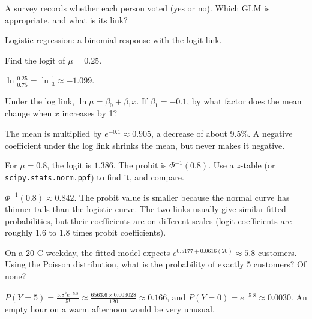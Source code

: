 \begin{Exercise}[label=glm2, title=Name the model]
A survey records whether each person voted (yes or no). Which GLM is appropriate, and what is its link?
\end{Exercise}
\begin{Answer}[ref=glm2]
Logistic regression: a binomial response with the logit link.
\end{Answer}

\begin{Exercise}[label=lf1, title=Logit value]
Find the logit of $\mu = 0.25$.
\end{Exercise}
\begin{Answer}[ref=lf1]
$\ln\frac{0.25}{0.75} = \ln\frac{1}{3} \approx -1.099$.
\end{Answer}

\begin{Exercise}[label=lf2, title=Interpret the log link]
Under the log link, $\ln\mu = \beta_0 + \beta_1 x$. If $\beta_1 = -0.1$, by what factor does the mean change when $x$
increases by 1?
\end{Exercise}
\begin{Answer}[ref=lf2]
The mean is multiplied by $e^{-0.1} \approx 0.905$, a decrease of about 9.5\%. A negative coefficient under the log
link shrinks the mean, but never makes it negative.
\end{Answer}

\begin{Exercise}[label=lf3, title=Logit versus probit]
For $\mu = 0.8$, the logit is $1.386$. The probit is $\Phi^{-1}(0.8)$. Use a $z$-table (or
\texttt{scipy.stats.norm.ppf}) to find it, and compare.
\end{Exercise}
\begin{Answer}[ref=lf3]
$\Phi^{-1}(0.8) \approx 0.842$. The probit value is smaller because the normal curve has thinner tails than the
logistic curve. The two links usually give similar fitted probabilities, but their coefficients are on different
scales (logit coefficients are roughly 1.6 to 1.8 times probit coefficients).
\end{Answer}

\begin{Exercise}[label=glm3, title={Poisson probabilities}, space=3cm]
On a 20 \textdegree C weekday, the fitted model expects $e^{0.5177 + 0.0616(20)} \approx 5.8$ customers. Using the
Poisson distribution, what is the probability of exactly 5 customers? Of none?
\end{Exercise}
\begin{Answer}[ref=glm3]
$P(Y = 5) = \frac{5.8^5 e^{-5.8}}{5!} \approx \frac{6563.6 \times 0.003028}{120} \approx 0.166$, and
$P(Y = 0) = e^{-5.8} \approx 0.0030$. An empty hour on a warm afternoon would be very unusual.
\end{Answer}

